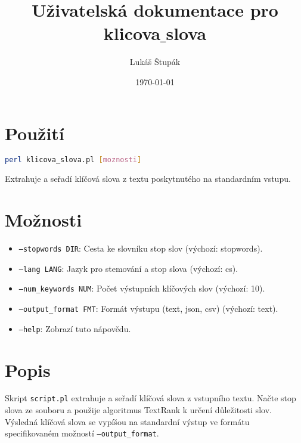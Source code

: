 \documentclass{article}
\title{Uživatelská dokumentace pro klicova$\_$slova}
\author{Lukáš Štupák}
\date{\today}
\begin{document}
\maketitle

\section{Použití}
\begin{lstlisting}[language=bash]
perl klicova_slova.pl [moznosti]
\end{lstlisting}

Extrahuje a seřadí klíčová slova z textu poskytnutého na standardním vstupu.

\section{Možnosti}
\begin{itemize}
  \item \texttt{--stopwords DIR}: Cesta ke slovníku stop slov (výchozí: stopwords).
  \item \texttt{--lang LANG}: Jazyk pro stemování a stop slova (výchozí: cs).
  \item \texttt{--num\_keywords NUM}: Počet výstupních klíčových slov (výchozí: 10).
  \item \texttt{--output\_format FMT}: Formát výstupu (text, json, csv) (výchozí: text).
  \item \texttt{--help}: Zobrazí tuto nápovědu.
\end{itemize}

\section{Popis}
Skript \texttt{script.pl} extrahuje a seřadí klíčová slova z vstupního textu. Načte stop slova ze souboru a použije algoritmus TextRank k určení důležitosti slov. Výsledná klíčová slova se vypíšou na standardní výstup ve formátu specifikovaném možností \texttt{--output\_format}.
\end{document}
